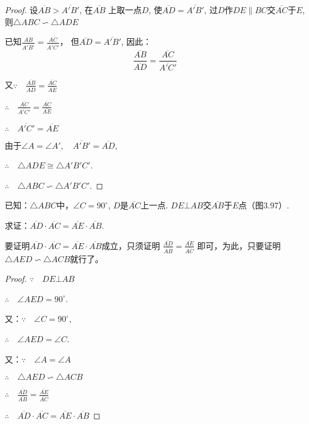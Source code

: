 \begin{proof}
设$\overline{AB}>\overline{A'B'}$, 在$\overline{AB}$
上取一点$D$, 
使$\overline{AD}=\overline{A'B'}$, 过$D$作$DE\parallel BC$交$\overline{AC}$于$E$, 则$\triangle ABC\backsim \triangle ADE$

已知$\frac{\overline{AB}}{\overline{A'B'}}=\frac{\overline{AC}}{\overline{A'C'}}$，
但$\overline{AD}=\overline{A'B'}$, 因此：
\[\frac{\overline{AB}}{\overline{AD}}=\frac{\overline{AC}}{\overline{A'C'}}\]

又$\because\quad \frac{\overline{AB}}{\overline{AD}}=\frac{\overline{AC}}{\overline{AE}}$

$\therefore\quad \frac{\overline{AC}}{\overline{A'C'}}=\frac{\overline{AC}}{\overline{AE}}$

$\therefore\quad \overline{A'C'}=\overline{AE}$

由于$\angle A=\angle A',\quad \overline{A'B'}=\overline{AD}$,

$\therefore\quad \triangle ADE\cong \triangle A'B'C'$.

$\therefore\quad \triangle ABC\backsim \triangle A'B'C'$.
\end{proof}

\begin{example}
    已知：$\triangle ABC$中，$\angle C=90^{\circ}$, $D$是$\overline{AC}$上一点. 
    $DE\bot AB$交$\overline{AB}$于$E$点（图3.97）.

    求证：$\overline{AD}\cdot \overline{AC}=\overline{AE}\cdot \overline{AB}$.
\end{example}

\begin{analyze}
    要证明$\overline{AD}\cdot \overline{AC}=\overline{AE}\cdot \overline{AB}$成立，只须证明
$\frac{\overline{AD}}{\overline{AB}}=\frac{\overline{AE}}{\overline{AC}}$
    即可，为此，只要证明$\triangle AED\backsim \triangle ACB$就行了。
\end{analyze}

\begin{proof}
$\because\quad DE\bot AB$

$\therefore\quad \angle AED=90^{\circ}$.

又：$\because\quad  \angle C=90^{\circ}$,

$\therefore\quad \angle AED=\angle C$.

又：$\because\quad \angle A=\angle A$

$\therefore\quad \triangle AED\backsim \triangle ACB$

$\therefore\quad \frac{\overline{AD}}{\overline{AB}}=\frac{\overline{AE}}{\overline{AC}}$

$\therefore\quad \overline{AD}\cdot \overline{AC}=\overline{AE}\cdot \overline{AB}$ 
\end{proof}

